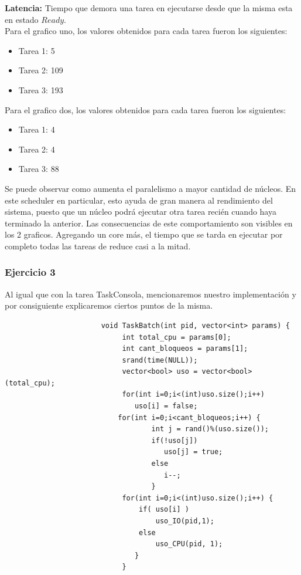 \textbf{Latencia:} Tiempo que demora una tarea en ejecutarse desde que la misma esta en estado $Ready$.\\

\indent Para el grafico uno, los valores obtenidos para cada tarea fueron los siguientes:\\

\begin{itemize}
 \item Tarea 1: 5
 \item Tarea 2: 109
 \item Tarea 3: 193
\end{itemize}

\indent Para el grafico dos, los valores obtenidos para cada tarea fueron los siguientes:\\

\begin{itemize}
 \item Tarea 1: 4
 \item Tarea 2: 4
 \item Tarea 3: 88
\end{itemize}

\indent Se puede observar como aumenta el paralelismo a mayor cantidad de núcleos. 
En este scheduler en particular, esto ayuda de gran manera al rendimiento del sistema, puesto que un núcleo podrá ejecutar otra tarea 
recién cuando haya terminado la anterior. Las consecuencias de este comportamiento son visibles en los 2 graficos. Agregando un core más, 
el tiempo que se tarda en ejecutar por completo todas las tareas de reduce casi a la mitad.\\

\subsubsection[Resolución Ejercicio 3]{Ejercicio 3}

\indent Al igual que con la tarea TaskConsola, mencionaremos nuestro implementación y por consiguiente  
explicaremos ciertos puntos de la misma.\\
 \begin{verbatim}
                       void TaskBatch(int pid, vector<int> params) {
                            int total_cpu = params[0];
                            int cant_bloqueos = params[1];
                            srand(time(NULL));
                            vector<bool> uso = vector<bool>(total_cpu);
                            for(int i=0;i<(int)uso.size();i++) 
                               uso[i] = false;
	                       for(int i=0;i<cant_bloqueos;i++) {
                                   int j = rand()%(uso.size());
                                   if(!uso[j])
                                      uso[j] = true;
                                   else
                                      i--; 
                                   }
                            for(int i=0;i<(int)uso.size();i++) {
                                if( uso[i] )
                                    uso_IO(pid,1); 
                                else
                                    uso_CPU(pid, 1); 
                               }
                            }
 \end{verbatim}

